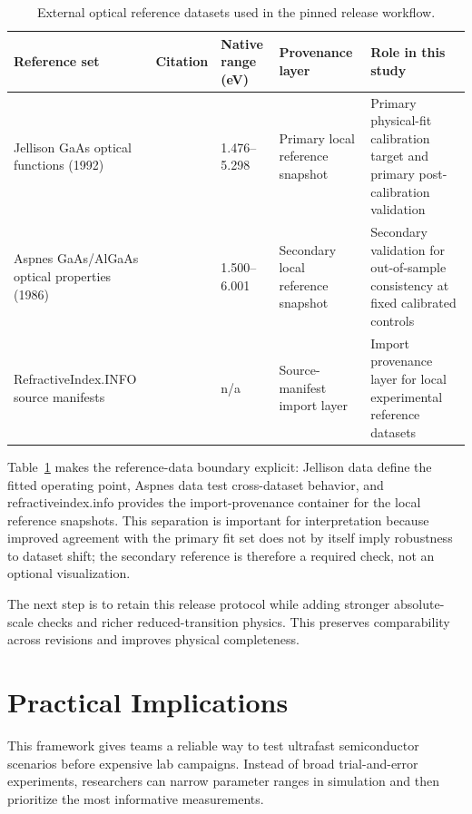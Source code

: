 \documentclass[aps,pra,twocolumn,reprint,superscriptaddress,nofootinbib]{revtex4-2}
\begin{document}
\begin{table}[t]
\centering
\caption{
External optical reference datasets used in the pinned release workflow.
}
\label{tab:discussion_reference_sources}
\small
\setlength{\tabcolsep}{4pt}
\begin{tabular}{p{}p{}p{}p{}p{}}
\toprule
Reference set & Citation & Native range (eV) & Provenance layer & Role in this study \\
\midrule
Jellison GaAs optical functions (1992) &
\cite{jellison1992optical} &
1.476--5.298 &
Primary local reference snapshot &
Primary physical-fit calibration target and primary post-calibration validation \\
Aspnes GaAs/AlGaAs optical properties (1986) &
\cite{aspnes1986optical} &
1.500--6.001 &
Secondary local reference snapshot &
Secondary validation for out-of-sample consistency at fixed calibrated controls \\
RefractiveIndex.INFO source manifests &
\cite{polyanskiy2024refractiveindexinfo} &
n/a &
Source-manifest import layer &
Import provenance layer for local experimental reference datasets \\
\bottomrule
\end{tabular}
\setlength{\tabcolsep}{6pt}
\end{table}

Table~\ref{tab:discussion_reference_sources} makes the reference-data boundary
explicit: Jellison data define the fitted operating point, Aspnes data test
cross-dataset behavior, and refractiveindex.info provides the import-provenance
container for the local reference snapshots. This separation is important for
interpretation because improved agreement with the primary fit set does not by
itself imply robustness to dataset shift; the secondary reference is therefore a
required check, not an optional visualization.

The next step is to retain this release protocol while adding stronger
absolute-scale checks and richer reduced-transition physics. This preserves
comparability across revisions and improves physical completeness.

\section{Practical Implications}
This framework gives teams a reliable way to test ultrafast semiconductor
scenarios before expensive lab campaigns. Instead of broad trial-and-error
experiments, researchers can narrow parameter ranges in simulation and then
prioritize the most informative measurements.
\end{document}
